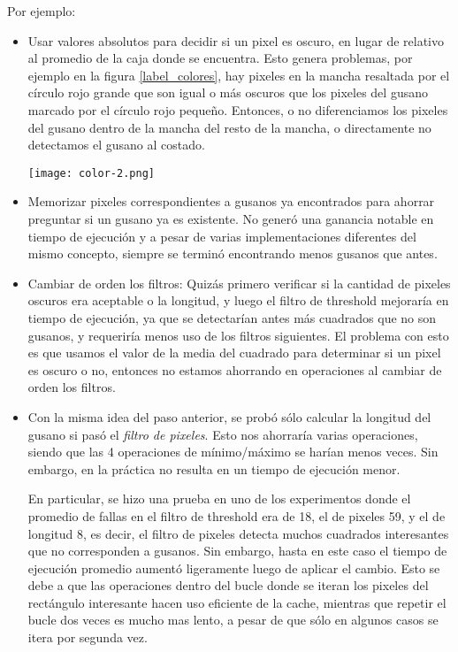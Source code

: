 \documentclass{article}
\begin{document}
Por ejemplo:
\begin{itemize}

\item Usar valores absolutos para decidir si un pixel es oscuro, en lugar de relativo al promedio de la caja donde se encuentra. Esto genera problemas, por ejemplo en la figura \ref{label_colores}, hay pixeles en la mancha resaltada por el círculo rojo grande que son igual o más oscuros que los pixeles del gusano marcado por el círculo rojo pequeño. Entonces, o no diferenciamos los pixeles del gusano dentro de la mancha del resto de la mancha, o directamente no detectamos el gusano al costado.
\begin{figure*}[h]
    \centering
    \texttt{[image: color-2.png]}
    \caption{Hay pixeles en el círculo grande más oscuros que el gusano del círculo chico}
    \label{label_colores}
\end{figure*}

\item Memorizar pixeles correspondientes a gusanos ya encontrados para ahorrar preguntar si un gusano ya es existente. No generó una ganancia notable en tiempo de ejecución y a pesar de varias implementaciones diferentes del mismo concepto, siempre se terminó encontrando menos gusanos que antes.

\item Cambiar de orden los filtros: Quizás primero verificar si la cantidad de pixeles oscuros era aceptable o la longitud, y luego el filtro de threshold mejoraría en tiempo de ejecución, ya que se detectarían antes más cuadrados que no son gusanos, y requeriría menos uso de los filtros siguientes. El problema con esto es que usamos el valor de la media del cuadrado para determinar si un pixel es oscuro o no, entonces no estamos ahorrando en operaciones al cambiar de orden los filtros.

\item Con la misma idea del paso anterior, se probó sólo calcular la longitud del gusano si pasó el \emph{filtro de pixeles}. Esto nos ahorraría varias operaciones, siendo que las 4 operaciones de mínimo/máximo se harían menos veces. Sin embargo, en la práctica no resulta en un tiempo de ejecución menor.

En particular, se hizo una prueba en uno de los experimentos donde el promedio de fallas en el filtro de threshold era de 18, el de pixeles 59, y el de longitud 8, es decir, el filtro de pixeles detecta muchos cuadrados interesantes que no corresponden a gusanos. Sin embargo, hasta en este caso el tiempo de ejecución promedio aumentó ligeramente luego de aplicar el cambio. Esto se debe a que las operaciones dentro del bucle donde se iteran los pixeles del rectángulo interesante hacen uso eficiente de la cache, mientras que repetir el bucle dos veces es mucho mas lento, a pesar de que sólo en algunos casos se itera por segunda vez.


\end{itemize}
\end{document}
